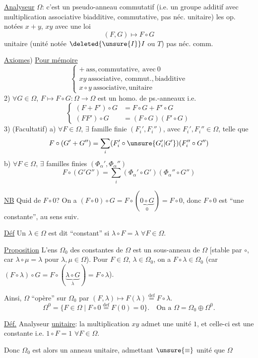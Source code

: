 \uline{Analyseur} $\Omega$: c'est un pseudo-anneau commutatif
(i.e. un groupe additif avec multiplication associative biadditive, commutative, pas néc. unitaire)
les op. notées $x+y$, $xy$
avec une loi 
\[
(F,G)\longmapsto F\circ G
\]
unitaire (unité notée $\deleted{\unsure{I}} I$ ou $T$) pas néc. comm.

\uline{Axiomes}) \uline{Pour mémoire}
\[
\left\{
\begin{array}{l}
+\ \mathrm{ass,commutative,\ avec}\ 0\\
xy\ \mathrm{associative,\ commut.,biadditive}\\
x\circ y\ \mathrm{associative,unitaire}
\end{array}
\right.
\]
2) $\forall G\in\Omega$, $F\longmapsto F\circ G:\Omega\longrightarrow\Omega$ est un homo. de ps.-anneaux i.e.
\[
\left\{
\begin{aligned}
(F+F')\circ G&=F\circ G+F'\circ G\\
(FF')\circ G&=(F\circ G)(F'\circ G)
\end{aligned}
\right.
\]
3) (Facultatif) a) $\forall F\in\Omega$, $\exists$ famille finie $(F_i',F_i'')$, avec $F_i',F_i''\in\Omega$, telle que
\[
F\circ(G'+G'')=\sum_i(F_i'\circ\unsure{G_i'|G'})(F_i''\circ G'')
\]
b) $\forall F\in\Omega$, $\exists$ familles finies $(\Phi_\alpha',\Phi_\alpha'')$
\[
F\circ(G'G'')=\sum_i(\Phi_\alpha'\circ G')(\Phi_\alpha''\circ G'')
\]

\uline{NB} Quid de $F\circ0$? On a $(F\circ0)\circ G=F\circ(\underbrace{0\circ G}_{0})=F\circ0$,
donc $F\circ0$ est ``une constante'', au sens suiv.

\uline{Déf} Un $\lambda\in\Omega$ est dit ``constant'' si $\lambda\circ F=\lambda$ $\forall F\in\Omega$.

\uline{Proposition} L'ens $\Omega_0$ des constantes de $\Omega$ est un sous-anneau de $\Omega$
[stable par $\circ$, car $\lambda\circ\mu=\lambda$ pour $\lambda,\mu\in\Omega$).
Pour $F\in\Omega$, $\lambda\in\Omega_0$, on a $F\circ\lambda\in\Omega_0$
(car $(F\circ\lambda)\circ G=F\circ(\underbrace{\lambda\circ G}_{\lambda})=F\circ\lambda$).

Ainsi, $\Omega$ ``opère'' sur $\Omega_0$ par $(F,\lambda)\longmapsto F(\lambda)\overset{\mathrm{def}}{=}F\circ\lambda$.
\[
\Omega^0=\{F\in\Omega\mid F\circ0\overset{\mathrm{def}}{=}F(0)=0\}.
\quad\text{On a }\Omega=\Omega_0\oplus\Omega^0.
\]

\uline{Déf.} Analyseur \uline{unitaire}: la multiplication $xy$ admet une unité $1$, et celle-ci est une constante i.e.
$1\circ F=1$ $\forall F\in\Omega$.

Donc $\Omega_0$ est alors un anneau unitaire, admettant
$\unsure{\equiv}$ unité que $\Omega$
